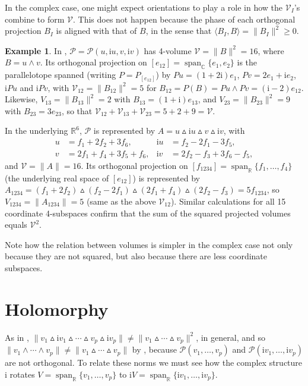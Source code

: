 \documentclass{birkjour}
\theoremstyle{definition}
\newtheorem{example}[theorem]{Example}
\def\R			{\mathds{R}}
\def\C			{\mathds{C}}
\def\VV			{\mathcal{V}}
\def\PP			{\mathcal{P}}
\def\im	 					{\mathrm{i}}				%
\newcommand\inner[1] 		{\langle #1 \rangle}		%
\def\rwedge			{\mathbin{\vartriangle}}
\def\cwedge			{\wedge}
\DeclareMathOperator{\Span}{span}
\begin{document}
In the complex case, one might expect orientations to play a role in how the $\VV_I$'s combine to form $\VV$.
This does not happen because the phase of each orthogonal projection $B_I$ is aligned with that of $B$, in the sense that $\inner{B_I,B} = \|B_I\|^2 \geq 0$.

\begin{example}
	In , $\PP = \PP(u,\im u,v,\im v)$ has  4-volume $\VV = \|B\|^2 = 16$, where $B= u \wedge v$.
	Its orthogonal projection on $[e_{12}] = \Span_\C\{e_1,e_2\}$ is the parallelotope spanned (writing $P=P_{[e_{12}]}$) by $Pu = (1+2\im)e_1$, $Pv = 2e_1 + \im e_2$, $\im Pu$ and $\im Pv$, with $\VV_{12} = \|B_{12}\|^2 = 5$ for $B_{12} = P(B) = Pu \wedge Pv = (\im-2)e_{12}$.
	Likewise, $V_{13} = \|B_{13}\|^2 = 2$ with $B_{13} = (1+\im) e_{13}$, and $V_{23} = \|B_{23}\|^2 = 9$ with $B_{23} = 3 e_{23}$,
	so that $\VV_{12} + \VV_{13} + \VV_{23} = 5+2+9 = \VV$.
	
	In the underlying $\R^6$, $\PP$ is represented by $A = u \rwedge \im u \rwedge v \rwedge \im v$, with
	\begin{align*}
		u &= f_1 + 2f_2 + 3 f_6, & \im u &= f_2 - 2f_1 - 3 f_5, \\
		v &= 2f_1 + f_4 + 3 f_5 + f_6, & \im v &= 2f_2 - f_3 + 3 f_6 - f_5,
	\end{align*}
	and $\VV = \|A\| = 16$.
	Its orthogonal projection on $[f_{1234}] = \Span_\R\{f_1,\ldots,f_4\}$ (the underlying real space of $[e_{12}]$) is represented by $A_{1234} = (f_1 + 2f_2) \rwedge (f_2 - 2f_1) \rwedge (2f_1 + f_4) \rwedge (2f_2 - f_3) = 5 f_{1234}$, so $V_{1234} = \|A_{1234}\| = 5$ (same as the above $\VV_{12}$).
	Similar calculations for all 15 coordinate 4-subspaces confirm that the sum of the squared projected volumes equals $\VV^2$.
\end{example}

Note how the relation between volumes is simpler in the complex case not only because they are not squared, but also because there are less coordinate subspaces.



\section{Holomorphy}\label{sc:Holomorphy}

As in , $\|v_1 \rwedge \im v_1 \rwedge \cdots \rwedge v_p \rwedge \im v_p\| \neq \|v_1\rwedge \cdots \rwedge v_p\|^2$, 
in general,
and so $\|v_1\cwedge \cdots \cwedge v_p\| \neq \|v_1\rwedge \cdots \rwedge v_p\|$ by ,
because $\PP(v_1,\ldots,v_p)$ and
$\PP(\im v_1,\ldots, \im v_p)$ are not orthogonal.
To relate these norms we must see how the complex structure $\im$ rotates $V = \Span_\R\{v_1,\ldots, v_p\}$ to $\im V = \Span_\R\{\im v_1,\ldots, \im v_p\}$.
\end{document}
